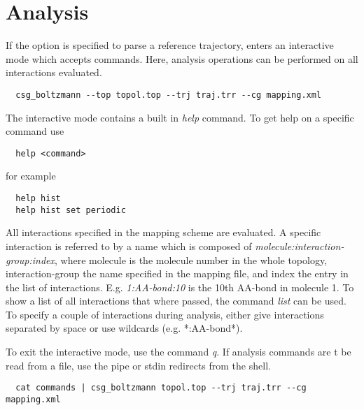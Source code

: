 \section{Analysis}
If the  option is specified to parse a reference trajectory,  enters an interactive mode which accepts commands. Here, analysis operations can be performed on all interactions evaluated.

\begin{verbatim}
  csg_boltzmann --top topol.top --trj traj.trr --cg mapping.xml
\end{verbatim}

The interactive mode contains a built in \textit{help} command. To get help on a specific command use
\begin{verbatim}
  help <command>
\end{verbatim}
for example
\begin{verbatim}
  help hist
  help hist set periodic
\end{verbatim}

All interactions specified in the mapping scheme are evaluated. A specific interaction is referred to by a name which is composed of \textit{molecule:interaction-group:index}, where molecule is the molecule number in the whole topology, interaction-group the name specified in the mapping file, and index the entry in the list of interactions. E.g. \textit{1:AA-bond:10} is the 10th AA-bond in molecule 1. To show a list of all interactions that where passed, the command \textit{list} can be used. To specify a couple of interactions during analysis, either give interactions separated by space or use wildcards (e.g. *:AA-bond*).

To exit the interactive mode, use the command \textit{q}. If analysis commands are t be read from a file, use the pipe or stdin redirects from the shell.
\begin{verbatim}
  cat commands | csg_boltzmann topol.top --trj traj.trr --cg mapping.xml
\end{verbatim}

